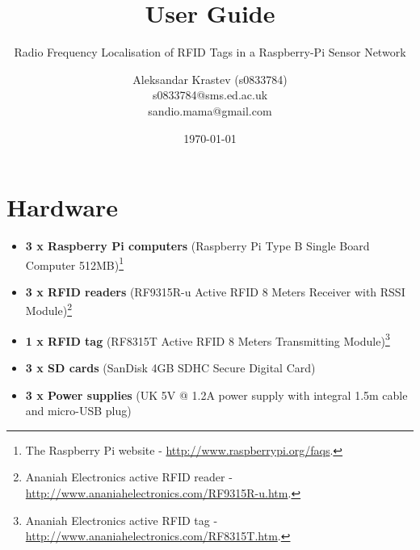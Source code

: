 \documentclass[a4paper,11pt]{scrartcl}
\begin{document}
\title{User Guide}
\subtitle{Radio Frequency Localisation of RFID Tags in a Raspberry-Pi Sensor Network}
\date{\today}
\author{Aleksandar Krastev (s0833784) \\ s0833784@sms.ed.ac.uk \\ sandio.mama@gmail.com}
\maketitle


\section{Hardware}

\begin{itemize}
	\item \textbf{3 x Raspberry Pi computers} (Raspberry Pi Type B Single Board Computer 512MB)\footnote{The Raspberry Pi website - \url{http://www.raspberrypi.org/faqs}.}
	\item \textbf{3 x RFID readers} (RF9315R-u Active RFID 8 Meters Receiver with RSSI Module)\footnote{Ananiah Electronics active RFID reader - \url{http://www.ananiahelectronics.com/RF9315R-u.htm}.}
	\item \textbf{1 x RFID tag} (RF8315T Active RFID 8 Meters Transmitting Module)\footnote{Ananiah Electronics active RFID tag - \url{http://www.ananiahelectronics.com/RF8315T.htm}.}
	\item \textbf{3 x SD cards} (SanDisk 4GB SDHC Secure Digital Card)	
	\item \textbf{3 x Power supplies} (UK 5V @ 1.2A power supply with integral 1.5m cable and micro-USB plug)
\end{itemize}
\end{document}
